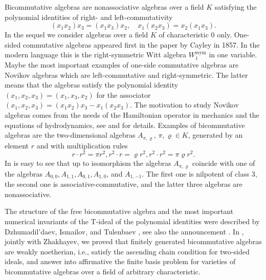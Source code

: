 \documentclass{amsart}[12pt]
\theoremstyle{definition}
\begin{document}
Bicommutative algebras are nonassociative algebras over a field $K$ satisfying the polynomial identities
of right- and left-commutativity
\begin{equation}\label{identities of bicommutativity}
(x_1x_2)x_3=(x_1x_3)x_2,\quad x_1(x_2x_3)=x_2(x_1x_3).
\end{equation}
In the sequel we consider algebras over a field $K$ of characteristic 0 only.
One-sided commutative algebras appeared first in the paper by Cayley \cite{Ca} in 1857.
In the modern language this is the right-symmetric Witt algebra $W_1^{\text{rsym}}$ in one variable.
Maybe the most important examples of one-side commutative algebras are Novikov algebras which are
left-commutative and right-symmetric. The latter means that the algebras satisfy the polynomial identity
$(x_1,x_2,x_3)=(x_1,x_3,x_2)$ for the associator $(x_1,x_2,x_3)=(x_1x_2)x_3-x_1(x_2x_3)$.
The motivation to study Novikov algebras comes from the needs of the Hamiltonian
operator in mechanics and the equations of hydrodynamics, see \cite{DIT} and \cite{DZ} for details.
Examples of bicommutative algebras are the two-dimensional algebras $A_{\pi,\varrho}$, $\pi,\varrho\in K$,
generated by an element $r$ and with multiplication rules
\begin{equation}\label{two-dimensional algebras}
r\cdot r^2=\pi r^2,r^2\cdot r=\varrho r^2,r^2\cdot r^2=\pi\varrho r^2.
\end{equation}
In is easy to see that up to isomorphism the algebras $A_{\pi,\varrho}$ coincide with one of the algebras
$A_{0,0},A_{1,1},A_{0,1},A_{1,0}$, and $A_{1,-1}$. The first one is nilpotent of class 3, the second one is associative-commutative,
and the latter three algebras are nonassociative.

The structure of the free bicommutative algebra and the most important numerical invariants of the T-ideal of the polynomial identities
were described by Dzhumadil'daev, Ismailov, and Tulenbaev \cite{DIT}, see also the announcement \cite{DT}.
In \cite{DZ}, jointly with Zhakhayev, we proved that finitely generated bicommutative algebras are weakly noetherian, i.e., satisfy the ascending chain
condition for two-sided ideals, and answer into affirmative the finite basis problem for varieties of bicommutative algebras
over a field of arbitrary characteristic.
\end{document}
